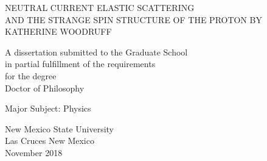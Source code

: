 \thispagestyle{empty}
\renewcommand{\baselinestretch}{2}
\begin{center}
NEUTRAL CURRENT ELASTIC SCATTERING \\ AND THE STRANGE SPIN STRUCTURE OF THE PROTON
\vspace{0.1in}
BY\\
\vspace{0.1in}
KATHERINE WOODRUFF
\end{center}
\vspace{1.0in}
\begin{center}
A dissertation submitted to the Graduate School\\
\vspace{0.1in}
in partial fulfillment of the requirements\\
\vspace{0.1in}
for the degree \\
\vspace{0.1in}
Doctor of Philosophy
\end{center}
\vfill
\begin{center}
Major Subject: Physics
\end{center}
\vspace{1.0in}
\begin{center}
New Mexico State University\\
\vspace{0.1in}
Las Cruces New Mexico\\
\vspace{0.1in}
November 2018
\end{center}
\newpage

